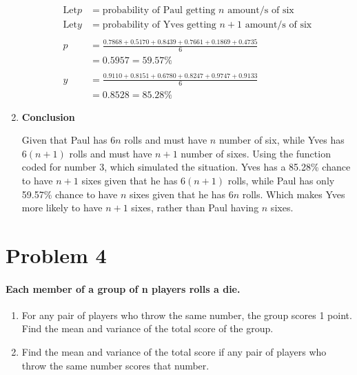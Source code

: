 \documentclass[12pt,letterpaper]{article}
\begin{document}
\begin{enumerate}[label=\Alph*]
        \begin{align*}
          \mbox{Let} p&=\mbox{probability of Paul getting $n$ amount/s of six}\\
          \mbox{Let} y&=\mbox{probability of Yves getting $n+1$ amount/s of six}\\\\
          p&=\frac{0.7868+0.5170+0.8439+0.7661+0.1869+0.4735}{6}\\
          &=0.5957=59.57\%\\\\
          y&=\frac{0.9110+0.8151+0.6780+0.8247+0.9747+0.9133}{6}\\
          &=0.8528=85.28\%
        \end{align*}

        \item \textbf{Conclusion}
        
        Given that Paul has $6n$ rolls and must have $n$ number of six, while Yves has $6(n + 1)$ rolls and must have $n+1$ number of sixes. Using the function coded for number 3, which simulated the situation. Yves has a 85.28\% chance to have $n + 1$ sixes given that he has $6(n + 1)$ rolls, while Paul has only 59.57\% chance to have $n$ sixes given that he has $6n$ rolls. Which makes Yves more likely to have $n + 1$ sixes, rather than Paul having $n$ sixes.
    \end{enumerate}

    \newpage

    \section*{Problem 4}
    \paragraph*{Each member of a group of n players rolls a die.}
    \begin{enumerate}[label=(\alph*)]
      \item For any pair of players who throw the same number, the group scores 1 point. Find the mean and variance of the total score of the group.
      \item Find the mean and variance of the total score if any pair of players who throw the same number scores that number.
    \end{enumerate}
\end{document}
